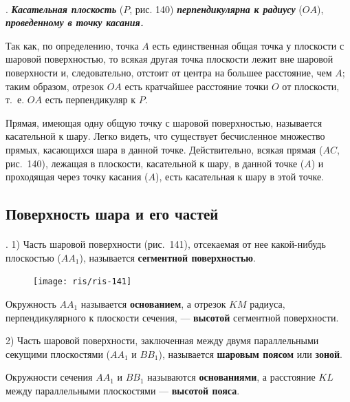 \documentclass[twoside]{book}
\begin{document}
\paragraph{}\label{1938/s133}
.
\textbf{\emph{Касательная плоскость}} ($P$, рис. 140) \textbf{\emph{перпендикулярна к радиусу}} ($OA$), \textbf{\emph{проведенному в точку касания.}}

Так как, по определению, точка $A$ есть единственная общая точка у плоскости с шаровой поверхностью, то всякая другая точка плоскости лежит вне шаровой поверхности и, следовательно, отстоит от центра на большее расстояние, чем $A$;
таким образом, отрезок $OA$ есть кратчайшее расстояние точки $O$ от плоскости, т.~е. $OA$ есть перпендикуляр к $P$.

Прямая, имеющая одну общую точку с шаровой поверхностью, называется касательной к шару.
Легко видеть, что существует бесчисленное множество прямых, касающихся шара в данной точке.
Действительно, всякая прямая ($AC$, рис.~140), лежащая в плоскости, касательной к шару, в данной точке ($A$) и проходящая через точку касания ($A$), есть касательная к шару в этой точке.

\subsection*{Поверхность шара и его частей}

\paragraph{}\label{1938/s134}
.
1) Часть шаровой поверхности (рис.~141), отсекаемая от нее какой-нибудь плоскостью ($AA_1$), называется \textbf{сегментной поверхностью}.

\begin{figure}[h!]
\centering
\texttt{[image: ris/ris-141]}
\caption{}
\end{figure}

Окружность $AA_1$ называется \textbf{основанием}, а отрезок $KM$ радиуса, перпендикулярного к плоскости сечения, --- \textbf{высотой} сегментной поверхности.

2) Часть шаровой поверхности, заключенная между двумя параллельными секущими плоскостями ($AA_1$ и $BB_1$), называется \textbf{шаровым поясом} или \textbf{зоной}. %

Окружности сечения $AA_1$ и $BB_1$ называются \textbf{основаниями}, а расстояние $KL$ между параллельными плоскостями --- \textbf{высотой пояса}.
\end{document}
